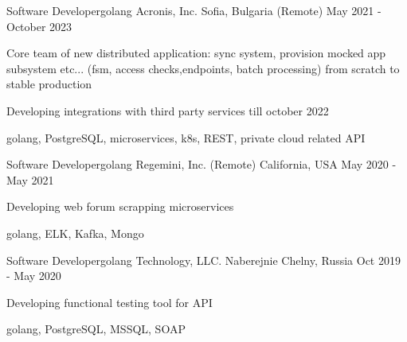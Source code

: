 

\begin{cventries}


  \cventry
    {Software Developer{\enskip\cdotp\enskip}golang} %
    {Acronis, Inc.} %
    {Sofia, Bulgaria (Remote)} %
    {May 2021 - October 2023} %
    {
      \begin{cvitems} %
        \item {Core team of new distributed application: sync system, provision mocked app subsystem etc... (fsm, access checks,endpoints, batch processing) from scratch to stable production}
        \item {Developing integrations with third party services till october 2022}
        \item {golang, PostgreSQL, microservices, k8s, REST, private cloud related API}
      \end{cvitems}
    }
    
  \cventry
    {Software Developer{\enskip\cdotp\enskip}golang} %
    {Regemini, Inc. (Remote)} %
    {California, USA} %
    {May 2020 - May 2021} %
    {
      \begin{cvitems} %
        \item {Developing web forum scrapping microservices}
        \item {golang, ELK, Kafka, Mongo}
      \end{cvitems}
    }

  \cventry
    {Software Developer{\enskip\cdotp\enskip}golang} %
    {Technology, LLC.} %
    {Naberejnie Chelny, Russia} %
    {Oct 2019 - May 2020} %
    {
      \begin{cvitems} %
        \item {Developing functional testing tool for API}
        \item {golang, PostgreSQL, MSSQL, SOAP}
      \end{cvitems}
    }


\end{cventries}
